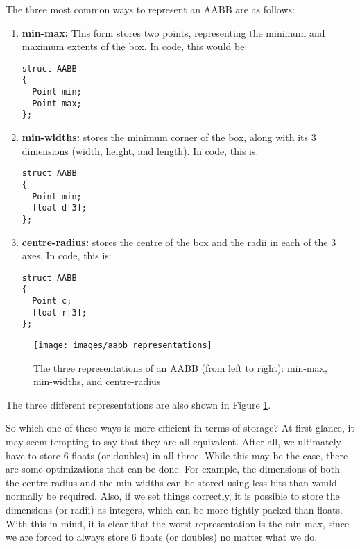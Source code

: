     The three most common ways to represent an AABB are as follows:
    \begin{enumerate}
      \item \textbf{min-max:} This form stores two points, representing the
        minimum and maximum extents of the box. In code, this would be:
        \begin{lstlisting}[caption=min-max AABB, style=codestyle]
struct AABB
{
  Point min;
  Point max;
};
        \end{lstlisting}

      \item \textbf{min-widths:} stores the minimum corner of the box, along
        with its 3 dimensions (width, height, and length). In code, this is: 
        \begin{lstlisting}[caption=min-widths AABB, style=codestyle]
struct AABB
{
  Point min;
  float d[3];
};
        \end{lstlisting}

      \item \textbf{centre-radius:} stores the centre of the box and the radii
        in each of the 3 axes. In code, this is:
        \begin{lstlisting}[caption=centre-radius AABB, style=codestyle]
struct AABB
{
  Point c;
  float r[3];
};
        \end{lstlisting}
    \end{enumerate}

    \begin{figure}
      \caption{The three representations of an AABB (from left to right):
      min-max, min-widths, and centre-radius}
      \label{fig:aabb}
      \texttt{[image: images/aabb\_representations]}
    \end{figure}

    The three different representations are also shown in Figure \ref{fig:aabb}.

    So which one of these ways is more efficient in terms of storage? At first
    glance, it may seem tempting to say that they are all equivalent. After all,
    we ultimately have to store 6 floats (or doubles) in all three. While this
    may be the case, there are some optimizations that can be done. For example,
    the dimensions of both the centre-radius and the min-widths can be stored
    using less bits than would normally be required. Also, if we set things
    correctly, it is possible to store the dimensions (or radii) as integers,
    which can be more tightly packed than floats. With this in mind, it is clear
    that the worst representation is the min-max, since we are forced to always
    store 6 floats (or doubles) no matter what we do.

